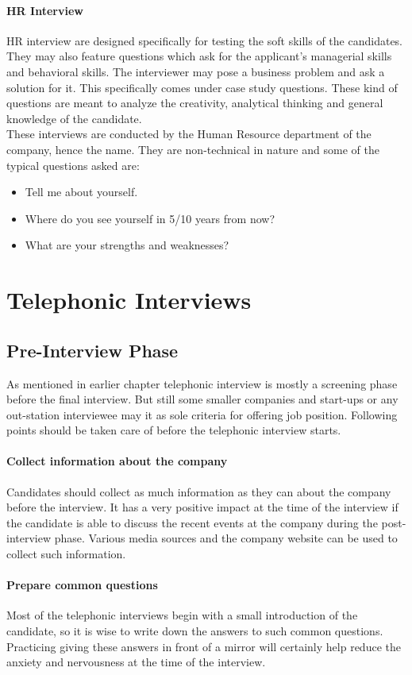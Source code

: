 \documentclass[a4paper,12pt]{report}
\begin{document}
\subsubsection{HR Interview}
HR interview are designed specifically for testing the soft skills of the candidates. They may also feature questions
which ask for the applicant's managerial skills and behavioral skills. The interviewer may pose a business problem 
and ask a solution for it. This specifically comes under case study questions. These kind of questions are meant to
analyze the creativity, analytical thinking and general knowledge of the candidate.\\
These interviews are conducted by the Human Resource department of the company, hence the name. They are non-technical 
in nature and some of the typical questions asked are:
\begin{itemize}
 \item Tell me about yourself.
 \item Where do you see yourself in 5/10 years from now?
 \item What are your strengths and weaknesses?
\end{itemize}

\chapter{Telephonic Interviews}
\section{Pre-Interview Phase}
As mentioned in earlier chapter telephonic interview is mostly a screening phase before the final interview. But still some
smaller companies and start-ups or any out-station interviewee may it as sole criteria for offering job position. Following points should
be taken care of before the telephonic interview starts.
\subsubsection{Collect information about the company}
Candidates should collect as much information as they can about the company before the interview. It has
a very positive impact at the time of the interview if the candidate is able to discuss the recent events at
the company during the post-interview phase. Various media sources and the company website can be used to
collect such information.
\subsubsection{Prepare common questions}
Most of the telephonic interviews begin with a small introduction of the candidate, so it is wise to write
down the answers to such common questions. Practicing giving these answers in front of a mirror will certainly
help reduce the anxiety and nervousness at the time of the interview.
\end{document}
